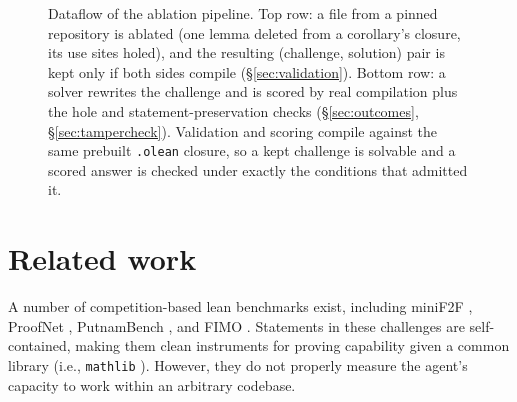 \documentclass{article}
\begin{document}
\begin{figure}[t]
  \caption{Dataflow of the ablation pipeline. Top row: a file from a pinned repository is
  ablated (one lemma deleted from a corollary's closure, its use sites holed), and the
  resulting (challenge, solution) pair is kept only if both sides compile
  (\S\ref{sec:validation}). Bottom row: a solver rewrites the challenge and is scored by real
  compilation plus the hole and statement-preservation checks (\S\ref{sec:outcomes},
  \S\ref{sec:tampercheck}). Validation and scoring compile against the same prebuilt
  \texttt{.olean} closure, so a kept challenge is solvable and a scored answer is checked under
  exactly the conditions that admitted it.}
  \label{fig:pipeline}
\end{figure}

\section{Related work}
\label{sec:related}

A number of competition-based lean benchmarks exist, including miniF2F \citep{zheng2022minif2f}, ProofNet \citep{azerbayev2023proofnet}, PutnamBench \citep{tsoukalas2024putnambench}, and FIMO \citep{liu2023fimo}. Statements in these challenges are self-contained, making them clean instruments for proving capability given a common library (i.e., \texttt{mathlib} \citep{mathlib2020}). However, they do not properly measure the agent’s capacity to work within an arbitrary codebase.
\end{document}
